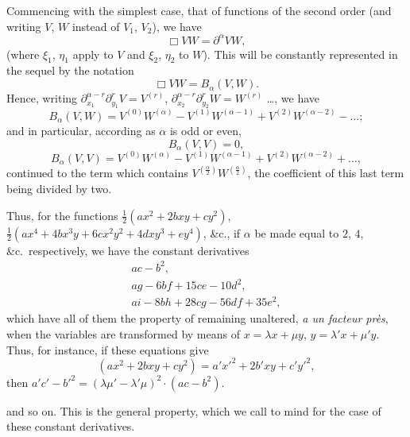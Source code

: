 \documentclass[11pt,a4paper]{article}
\theoremstyle{plain}
\theoremstyle{definition}
\theoremstyle{remark}
\begin{document}
Commencing with the simplest case, that of functions of the second order (and
writing $V$, $W$ instead of $V_1$, $V_2$), we have
\[
\Box VW = \partial^{\alpha} VW,
\]
(where $\xi_1$, $\eta_1$ apply to $V$ and $\xi_2$, $\eta_2$ to $W$). This will be constantly represented in
the sequel by the notation
\[
\Box VW = B_{\alpha}(V, W).
\]
Hence, writing $\partial_{x_1}^{\alpha-r} \partial_{y_1}^r V = V^{(r)}$, $\partial_{x_2}^{\alpha-r} \partial_{y_2}^r W = W^{(r)}$ \ldots,
we have
\[
B_{\alpha}(V, W) = V^{(0)} W^{(\alpha)} - V^{(1)} W^{(\alpha-1)} + V^{(2)} W^{(\alpha-2)} - \ldots;
\]
and in particular, according as $\alpha$ is odd or even,
\[
B_{\alpha}(V, V) = 0,
\]
\[
B_{\alpha}(V, V) = V^{(0)} W^{(\alpha)} - V^{(1)} W^{(\alpha-1)} + V^{(2)} W^{(\alpha-2)} + \ldots,
\]
continued to the term which contains $V^{(\frac{\alpha}{2})} W^{(\frac{\alpha}{2})}$, the coefficient of this last term
being divided by two.

Thus, for the functions $\tfrac{1}{2}(ax^2 + 2bxy + cy^2)$, $\tfrac{1}{2}(ax^4 + 4bx^3y + 6cx^2y^2 + 4dxy^3 + ey^4)$, \&c.,
if $\alpha$ be made equal to $2$, $4$, \&c.\ respectively, we have the constant derivatives
\begin{align*}
ac - b^2, \\
ag - 6bf + 15ce - 10d^2, \\
ai - 8bh + 28cg - 56df + 35e^2,
\end{align*}
which have all of them the property of remaining unaltered, \textit{a un facteur pr\`{e}s}, when
the variables are transformed by means of $x = \lambda x + \mu y$, $y = \lambda' x + \mu' y$. Thus, for instance,
if these equations give
\[
(ax^2 + 2bxy + cy^2) = a'x'^2 + 2b'xy + c'y'^2,
\]
then $a'c' - b'^2 = (\lambda\mu' - \lambda'\mu)^2 \cdot (ac - b^2)$.

and so on. This is the general property, which we call to mind for the case of these
constant derivatives.
\end{document}

